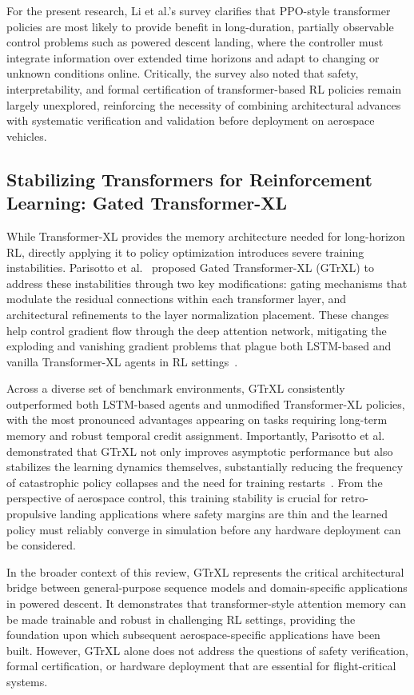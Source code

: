 \documentclass[10pt,twocolumn]{article}
\begin{document}
For the present research, Li et al.'s survey clarifies that PPO-style transformer policies are most likely to provide benefit in long-duration, partially observable control problems such as powered descent landing, where the controller must integrate information over extended time horizons and adapt to changing or unknown conditions online.
Critically, the survey also noted that safety, interpretability, and formal certification of transformer-based RL policies remain largely unexplored, reinforcing the necessity of combining architectural advances with systematic verification and validation before deployment on aerospace vehicles.

\subsection{Stabilizing Transformers for Reinforcement Learning: Gated Transformer-XL}

While Transformer-XL provides the memory architecture needed for long-horizon RL, directly applying it to policy optimization introduces severe training instabilities.
Parisotto et al.~\cite{parisotto2020} proposed Gated Transformer-XL (GTrXL) to address these instabilities through two key modifications: gating mechanisms that modulate the residual connections within each transformer layer, and architectural refinements to the layer normalization placement.
These changes help control gradient flow through the deep attention network, mitigating the exploding and vanishing gradient problems that plague both LSTM-based and vanilla Transformer-XL agents in RL settings~\cite{parisotto2020}.

Across a diverse set of benchmark environments, GTrXL consistently outperformed both LSTM-based agents and unmodified Transformer-XL policies, with the most pronounced advantages appearing on tasks requiring long-term memory and robust temporal credit assignment.
Importantly, Parisotto et al. demonstrated that GTrXL not only improves asymptotic performance but also stabilizes the learning dynamics themselves, substantially reducing the frequency of catastrophic policy collapses and the need for training restarts~\cite{parisotto2020}.
From the perspective of aerospace control, this training stability is crucial for retro-propulsive landing applications where safety margins are thin and the learned policy must reliably converge in simulation before any hardware deployment can be considered.

In the broader context of this review, GTrXL represents the critical architectural bridge between general-purpose sequence models and domain-specific applications in powered descent.
It demonstrates that transformer-style attention memory can be made trainable and robust in challenging RL settings, providing the foundation upon which subsequent aerospace-specific applications have been built.
However, GTrXL alone does not address the questions of safety verification, formal certification, or hardware deployment that are essential for flight-critical systems.
\end{document}
